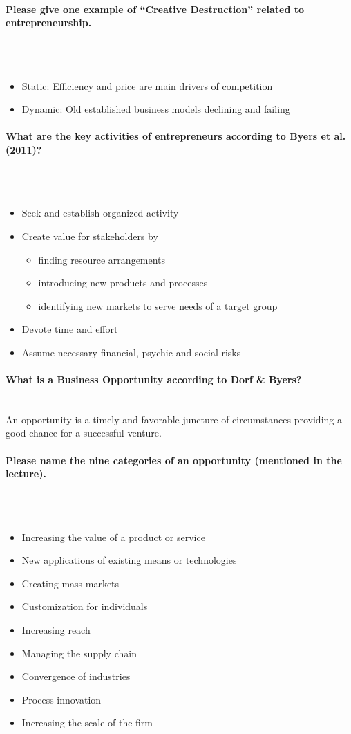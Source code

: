 \documentclass[10pt,a4paper,noendnumber=true]{scrartcl}
\newcommand{\properparagraph}[1]{\paragraph{\textcolor{Emerald}{#1}}\mbox{}\\}
\begin{document}
\properparagraph{Please give one example of “Creative Destruction” related to entrepreneurship.}
\\[-6ex]
\begin{itemize}
	\item Static: Efficiency and price are main drivers of competition
	\item Dynamic: Old established business models declining and failing	
\end{itemize}

\properparagraph{What are the key activities of entrepreneurs according to Byers et al. (2011)?}
\\[-6ex]
\begin{itemize}
	\item Seek and establish organized activity
	\item Create value for stakeholders by
	\begin{itemize}
		\item finding resource arrangements
		\item introducing new products and processes
		\item identifying new markets to serve needs of a target group
	\end{itemize}
	\item Devote time and effort
	\item Assume necessary financial, psychic and social risks
\end{itemize}


\properparagraph{What is a Business Opportunity according to Dorf \& Byers?}
An opportunity is a timely and favorable juncture of circumstances providing a good chance for a successful venture.

\properparagraph{Please name the nine categories of an opportunity (mentioned in the lecture).}
\\[-6ex]
\begin{itemize}
	\item Increasing the value of a product or service
	\item New applications of existing means or technologies
	\item Creating mass markets
	\item Customization for individuals
	\item Increasing reach
	\item Managing the supply chain
	\item Convergence of industries
	\item Process innovation
	\item Increasing the scale of the firm
\end{itemize}
\end{document}
